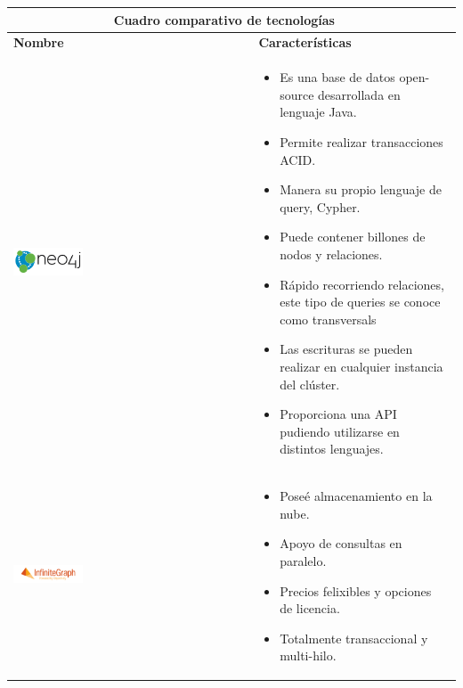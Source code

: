 \newpage
\begin{table}[b!]
	\centering
	\begin{tabular}{|p{2cm}|ll}
		\hline
		\multicolumn{2}{|c|}{{\bf Cuadro comparativo de tecnologías}} \\ 
		\hline
		\multicolumn{1}{|p{4cm}|}{{\bf Nombre}}                                                &   
		\multicolumn{1}{p{10cm}|}{{\bf Características}}\\
		\hline
		\multicolumn{1}{|p{5cm}|}{\includegraphics[width=0.3\textwidth]{images/neo4j}}         &   
		\multicolumn{2}{p{10cm}|}{\begin{itemize}
		\vspace{-15mm}
		\item Es una base de datos open-source desarrollada en lenguaje Java.
		\item Permite realizar transacciones ACID.
		\item Manera su propio lenguaje de query, Cypher.
		\item Puede contener billones de nodos y relaciones.
		\item Rápido recorriendo relaciones, este tipo de queries se conoce como transversals
		\item Las escrituras se pueden realizar en cualquier instancia del clúster.
		\item Proporciona una API pudiendo utilizarse en distintos lenguajes.
		\cite{31}
		\end{itemize}} \\
		\hline
		\multicolumn{1}{|p{5cm}|}{\includegraphics[width=0.3\textwidth]{images/InfiniteGraph}} &   
		\multicolumn{1}{p{10cm}|}{
		\begin{itemize}
		\vspace{-7mm}
		\item Poseé almacenamiento en la nube.
		\item Apoyo de consultas en paralelo.
		\item Precios felixibles y opciones de licencia.
		\item Totalmente transaccional y multi-hilo.
		\cite{32}
		\end{itemize}} \\ 

\end{tabular}
\end{table}
